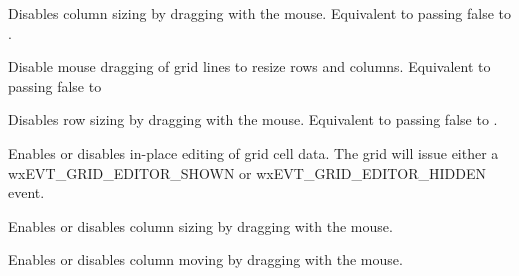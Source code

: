 \label{wxgriddisabledragcolsize}


Disables column sizing by dragging with the mouse. Equivalent to passing false to
.



\label{wxgriddisabledraggridsize}


Disable mouse dragging of grid lines to resize rows and columns. Equivalent to passing
false to 



\label{wxgriddisabledragrowsize}


Disables row sizing by dragging with the mouse. Equivalent to passing false to
.



\label{wxgridenablecelleditcontrol}


Enables or disables in-place editing of grid cell data. The grid will issue either a
wxEVT\_GRID\_EDITOR\_SHOWN or wxEVT\_GRID\_EDITOR\_HIDDEN event.



\label{wxgridenabledragcolsize}


Enables or disables column sizing by dragging with the mouse.



\label{wxgridenabledragcolmove}


Enables or disables column moving by dragging with the mouse.



\label{wxgridenabledraggridsize}


